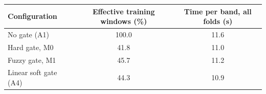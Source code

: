 \begin{tabular}{@{}lcc@{}}
\toprule
Configuration & Effective training windows (\%) & Time per band, all folds (s)\\
\midrule
No gate (A1) & 100.0 & 11.6\\
Hard gate, M0 & 41.8 & 11.0\\
Fuzzy gate, M1 & 45.7 & 11.2\\
Linear soft gate (A4) & 44.3 & 10.9\\
\bottomrule
\end{tabular}
